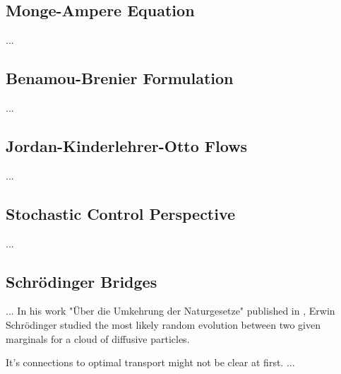 \subsection{Monge-Ampere Equation} \label{sec:background_monge_ampere}

...

\subsection{Benamou-Brenier Formulation} \label{sec:background_benamou_brenier}

...

\subsection{Jordan-Kinderlehrer-Otto Flows} \label{sec:background_jko}

...

\subsection{Stochastic Control Perspective} \label{sec:background_control}

...

\subsection{Schr{\"o}dinger Bridges} \label{sec:background_sb}

...
In his work "{\"U}ber die Umkehrung der Naturgesetze" published in \citeyear{schrodinger1931umkehrung}, Erwin Schr{\"o}dinger studied the most likely random evolution between two given marginals for a cloud of diffusive particles.

It's connections to optimal transport might not be clear at first. ...



